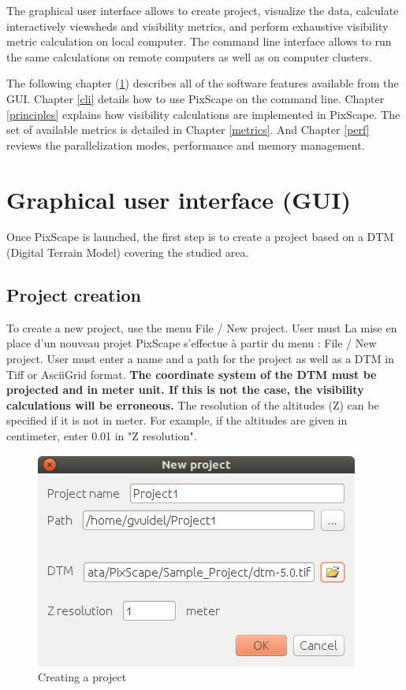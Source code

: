 \documentclass{report}
\begin{document}
The graphical user interface allows to create project, visualize the data, calculate interactively viewsheds and visibility metrics, and perform exhaustive visibility metric calculation on local computer. The command line interface allows to run the same calculations on remote computers as well as on computer clusters.

The following chapter (\ref{gui}) describes all of the software features available from the GUI. Chapter \ref{cli} details how to use PixScape on the command line. Chapter \ref{principles} explains how visibility calculations are implemented in PixScape. The set of available metrics is detailed in Chapter \ref{metrics}. And Chapter \ref{perf} reviews the parallelization modes, performance and memory management.


\chapter{Graphical user interface (GUI)}
\label{gui}

Once PixScape is launched, the first step is to create a project based on a DTM (Digital Terrain Model) covering the studied area.

\section{Project creation}

To create a new project, use the menu File / New project. User must 
La mise en place d’un nouveau projet PixScape s’effectue à partir du menu : File / New project. User must enter a name and a path for the project as well as a DTM in Tiff or AsciiGrid format. \textbf{The coordinate system of the DTM must be projected and in meter unit. If this is not the case, the visibility calculations will be erroneous.} The resolution of the altitudes (Z) can be specified if it is not in meter. For example, if the altitudes are given in centimeter, enter 0.01 in "Z resolution".

\begin{figure}[H]
	\includegraphics[scale=0.5]{img/new_project-en.png} 
	\caption{Creating a project}
\end{figure}
\end{document}
